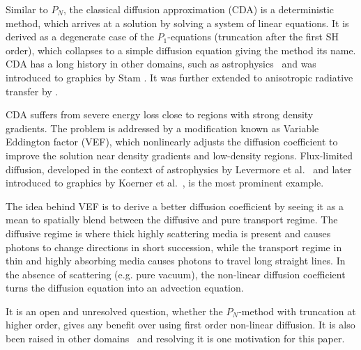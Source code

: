 Similar to $P_N$, the classical diffusion approximation (CDA) is a deterministic method, which arrives at a solution by solving a system of linear equations. It is derived as a degenerate case of the $P_1$-equations (truncation after the first SH order), which collapses to a simple diffusion equation giving the method its name. CDA has a long history in other domains, such as astrophysics~\cite{Ishimaru78} and was introduced to graphics by Stam \cite{Stam95}. It was further extended to anisotropic radiative transfer by \cite{Jakob10}.

CDA suffers from severe energy loss close to regions with strong density gradients. The problem is addressed by a modification known as Variable Eddington factor (VEF), which nonlinearly adjusts the diffusion coefficient to improve the solution near density gradients and low-density regions. Flux-limited diffusion, developed in the context of astrophysics by Levermore et al.~\cite{Levermore81} and later introduced to graphics by Koerner et al.~\cite{Koerner14}, is the most prominent example.

The idea behind VEF is to derive a better diffusion coefficient by seeing it as a mean to spatially blend between the diffusive and pure transport regime. The diffusive regime is where thick highly scattering media is present and causes photons to change directions in short succession, while the transport regime in thin and highly absorbing media causes photons to travel long straight lines. In the absence of scattering (e.g. pure vacuum), the non-linear diffusion coefficient turns the diffusion equation into an advection equation.

It is an open and unresolved question, whether the $P_N$-method with truncation at higher order, gives any benefit over using first order non-linear diffusion. It is also been raised in other domains~\cite{Olson00} and resolving it is one motivation for this paper.
 



